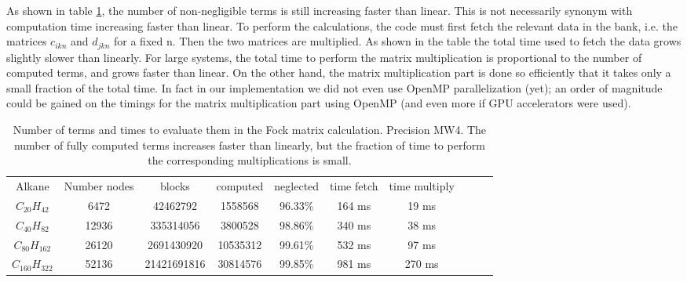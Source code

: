 \documentclass[%
 aip,
 amsmath,amssymb,
 reprint,%
]{revtex4-1}
\begin{document}
 As shown in table \ref{tab:adapF}, the number of non-negligible terms is still increasing faster than linear. %
 This is not necessarily synonym with computation time increasing faster than linear. To perform the calculations, the code must first fetch the relevant data in the bank, i.e. the matrices $c_{ikn}$ and  $d_{jkn}$ for a fixed n. Then the two matrices are multiplied. As shown in the table the total time used to fetch the data grows slightly slower than linearly. 
 For large systems, the total time to perform the matrix multiplication is proportional to the number of computed terms, and grows faster than linear. On the other hand, the matrix multiplication part is done so efficiently that it takes only a small fraction of the total time. In fact in our implementation we did not even use OpenMP parallelization (yet); an order of magnitude could be gained on the timings for the matrix multiplication part using OpenMP (and even more if GPU accelerators were used). 

\begin{table}[t]
    \centering
    \begin{tabular}{cccccccccc}
Alkane & Number nodes & blocks&  computed & neglected& time fetch& time multiply\\
$C_{20}H_{42}$   & 6472  &    42462792 &  1558568 & 96.33\% &164 ms & 19 ms\\ 
$C_{40}H_{82}$   & 12936 &   335314056 &  3800528 & 98.86\% &340 ms & 38 ms\\ 
$C_{80}H_{162}$  & 26120 &  2691430920 & 10535312 & 99.61\% &532 ms & 97 ms\\ 
$C_{160}H_{322}$ & 52136 & 21421691816 & 30814576 & 99.85\% &981 ms &270 ms\\ 
    \end{tabular}
    \caption{Number of terms and times to evaluate them in the Fock matrix calculation. Precision MW4. The number of fully computed terms increases faster than linearly, but the fraction of time to perform the corresponding multiplications is small.} %
    \label{tab:adapF}
\end{table}
\end{document}
